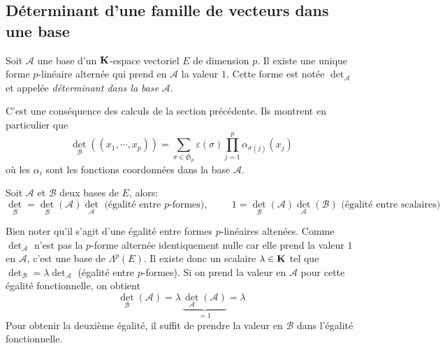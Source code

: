 \subsection{Déterminant d'une famille de vecteurs dans une base}
\begin{propn}
 Soit $\mathcal{A}$ une base d'un $\mathbf{K}$-espace vectoriel $E$ de dimension $p$. Il existe une unique forme $p$-linéaire alternée qui prend en $\mathcal{A}$ la valeur $1$. Cette forme est notée $\det_{\mathcal{A}}$ et appelée \emph{déterminant dans la base} $\mathcal{A}$.
\end{propn}
\begin{demo}
 C'est une conséquence des calculs de la section précédente. Ils montrent en particulier que 
\begin{displaymath}
 \det_{\mathcal{B}}\left( (x_1,\cdots,x_p)\right) 
= \sum_{\sigma\in \mathfrak{S}_p}\varepsilon(\sigma) \prod_{j=1}^p\alpha_{\sigma(j)}(x_j)
\end{displaymath}
où les $\alpha_i$ sont les fonctions coordonnées dans la base $\mathcal{A}$.
\end{demo}
\begin{propn}
 Soit $\mathcal{A}$ et $\mathcal{B}$ deux bases de $E$, alors:
\begin{displaymath}
 \det_{\mathcal{B}} = \det_{\mathcal{B}}(\mathcal{A})\det_{\mathcal{A}}\text{ (égalité entre $p$-formes)},\hspace{1cm}
1= \det_{\mathcal{B}}(\mathcal{A})\det_{\mathcal{A}}(\mathcal{B})\text{ (égalité entre scalaires)}
\end{displaymath}
\end{propn}
\begin{demo}
 Bien noter qu'il s'agit d'une égalité entre formes $p$-linéaires altenées. Comme $\det_{\mathcal{A}}$ n'est pas la $p$-forme alternée identiquement nulle car elle prend la valeur $1$ en $\mathcal{A}$, c'est une base de $\Lambda^p(E)$. Il existe donc un scalaire $\lambda\in \mathbf{K}$ tel que $\det_{\mathcal{B}} = \lambda\det_{\mathcal{A}}$ (égalité entre $p$-formes). Si on prend la valeur en $\mathcal{A}$ pour cette égalité fonctionnelle, on obtient
\begin{displaymath}
 \det_{\mathcal{B}}(\mathcal{A}) = \lambda \, \underset{=1}{\underbrace{\det_{\mathcal{A}}(\mathcal{A})}} = \lambda
\end{displaymath}
Pour obtenir la deuxième égalité, il suffit de prendre la valeur en $\mathcal{B}$ dans l'égalité fonctionnelle.
\end{demo}
